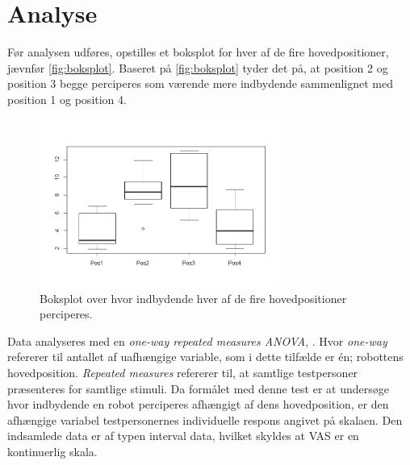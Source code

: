 \section*{Analyse}
\label{Analyse}
%
Før analysen udføres, opstilles et boksplot for hver af de fire hovedpositioner, jævnfør \autoref{fig:boksplot}. Baseret på \autoref{fig:boksplot} tyder det på, at position 2 og position 3 begge perciperes som værende mere indbydende sammenlignet med position 1 og position 4.   
%
\begin{figure}[H]
\centering
\includegraphics[width = 0.7\textwidth]{Figure/Rplot.png} 
\caption{Boksplot over hvor indbydende hver af de fire hovedpositioner perciperes.}
\label{fig:boksplot}
\end{figure}
\noindent
%
Data analyseres med en \textit{one-way repeated measures ANOVA}, \parencite[s. 554]{DiscoveringStatisticsUsingR}. Hvor \textit{one-way} refererer til antallet af uafhængige variable, som i dette tilfælde er én; robottens hovedposition. \textit{Repeated measures} refererer til, at samtlige testpersoner præsenteres for samtlige stimuli. Da formålet med denne test er at undersøge hvor indbydende en robot perciperes afhængigt af dens hovedposition, er den afhængige variabel testpersonernes individuelle respons angivet på skalaen. Den indsamlede data er af typen interval data, hvilket skyldes at VAS er en kontinuerlig skala. 

